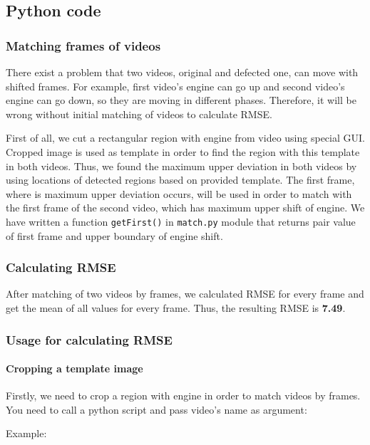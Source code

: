 \documentclass{IEEEtran}
\begin{document}
\subsection{Python code}

\subsubsection{Matching frames of videos}

There exist a problem that two videos, original and defected one, can move with shifted frames. For example, first video’s engine can go up and second video’s engine can go down, so they are moving in different phases. Therefore, it will be wrong without initial matching of videos to calculate RMSE.

First of all, we cut a rectangular region with engine from video using special GUI. Cropped image is used as template in order to find the region with this template in both videos. Thus, we found the maximum upper deviation in both videos by using locations of detected regions based on provided template. The first frame, where is maximum upper deviation occurs, will be used in order to match with the first frame of the second video, which has maximum upper shift of engine. We have written a function \texttt{getFirst()} in \texttt{match.py}  module that returns pair value of first frame and upper boundary of engine shift. 

\subsubsection{Calculating RMSE}

After matching of two videos by frames, we calculated RMSE for every frame and get the mean of all values for every frame. Thus, the resulting RMSE is \textbf{7.49}.

\subsubsection{Usage for calculating RMSE}

\paragraph{Cropping a template image}

Firstly, we need to crop a region with engine in order to match videos by frames. 
You need to call a python script and pass video’s name as argument:

Example:
\end{document}
